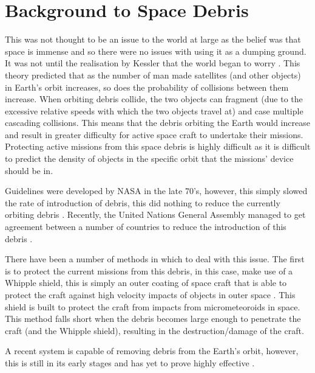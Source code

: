 \documentclass[11pt]{witseiepaper}
\begin{document}
\section{Background to Space Debris} \label{sec:BackgroundToSpaceDebris}
This was not thought to be an issue to the world at large as the belief was that space is immense and so there were no issues with using it as a dumping ground. It was not until the realisation by Kessler that the world began to worry \cite{Kessler}. This theory predicted that as the number of man made satellites (and other objects) in Earth's orbit increases, so does the probability of collisions between them increase. When orbiting debris collide, the two objects can fragment (due to the excessive relative speeds with which the two objects travel at) and case multiple cascading collisions. This means that the debris orbiting the Earth would increase and result in greater difficulty for active space craft to undertake their missions.
Protecting active missions from this space debris is highly difficult as it is difficult to predict the density of objects in the specific orbit that the missions' device should be in.

Guidelines were developed by NASA in the late 70's, however, this simply slowed the rate of introduction of debris, this did nothing to reduce the currently orbiting debris \cite{spaceDebrisGuide}. Recently, the United Nations General Assembly managed to get agreement between a number of countries to reduce the introduction of this debris \cite{debrisGuidelinesAgreement}.

There have been a number of methods in which to deal with this issue. The first is to protect the current missions from this debris, in this case, make use of a Whipple shield, this is simply an outer coating of space craft that is able to protect the craft against high velocity impacts of objects in outer space \cite{Whipple}. This shield is built to protect the craft from impacts from micrometeoroids in space.
This method falls short when the debris becomes large enough to penetrate the craft (and the Whipple shield), resulting in the destruction/damage of the craft.

A recent system is capable of removing debris from the Earth's orbit, however, this is still in its early stages and has yet to prove highly effective \cite{removalSpaceDebris}.
\end{document}
